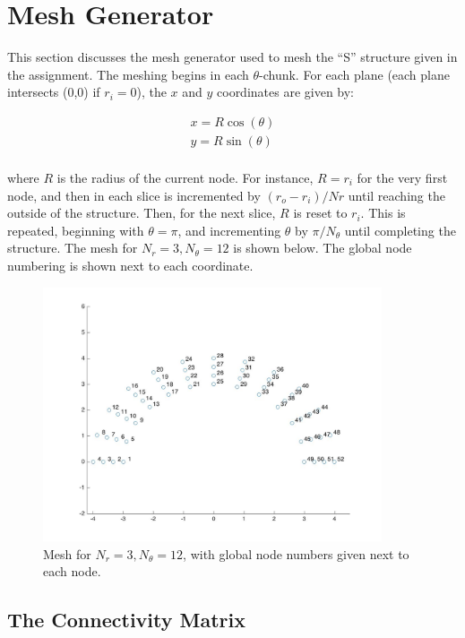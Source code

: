 \documentclass[10pt]{article}
\begin{document}
\section{Mesh Generator}

This section discusses the mesh generator used to mesh the ``S'' structure given in the assignment. The meshing begins in each \(\theta\)-chunk. For each plane (each plane intersects (0,0) if \(r_i=0\)), the \(x\) and \(y\) coordinates are given by:

\begin{equation}
\begin{aligned}
x=R\cos{(\theta)}\\
y=R\sin{(\theta)}\\
\end{aligned}
\end{equation}

where \(R\) is the radius of the current node. For instance, \(R=r_i\) for the very first node, and then in each slice is incremented by \((r_o-r_i)/Nr\) until reaching the outside of the structure. Then, for the next slice, \(R\) is reset to \(r_i\). This is repeated, beginning with \(\theta=\pi\), and incrementing \(\theta\) by \(\pi/N_\theta\) until completing the structure. The mesh for \(N_r=3,N_\theta=12\) is shown below. The global node numbering is shown next to each coordinate.

\begin{figure}[H]
  \centering
  \includegraphics[width=10cm]{Mesh.jpg}
  \caption{Mesh for \(N_r=3, N_\theta=12\), with global node numbers given next to each node.}
  \label{fig:Mesh}
\end{figure}

\subsection{The Connectivity Matrix}
\end{document}
